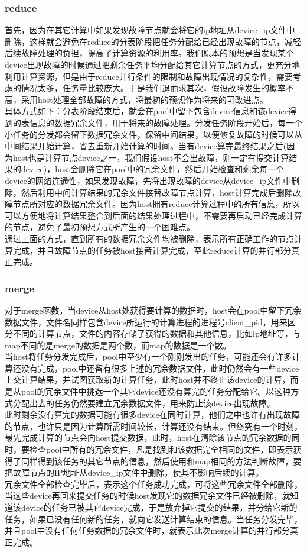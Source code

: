 \documentclass[paper=a4]{ctexart} %
\numberwithin{equation}{section} %
\numberwithin{figure}{section} %
\numberwithin{table}{section} %
\newcommand{\n}{\\\indent}
\begin{document}
\subsubsection{reduce}

    首先，因为在其它计算中如果发现故障节点就会将它的ip地址从device\_ip文件中删除，这样就会避免在reduce的分表阶段把任务分配给已经出现故障的节点，减轻后续故障处理的负担，提高了计算资源的利用率。我们原本的预想是当发现某个device出现故障的时候通过把剩余任务平均分配给其它计算节点的方式，更充分地利用计算资源，但是由于reduce并行条件的限制和故障出现情况的复杂性，需要考虑的情况太多，任务量比较庞大。于是我们退而求其次，假设故障发生的概率不高，采用host处理全部故障的方式，将最初的预想作为将来的可改进点。\n
    具体方式如下：分表阶段结束后，就会在pool中留下包含device信息和该device得到的表信息的数据冗余文件，用于将来的故障处理。分发任务阶段开始后，每一个小任务的分发都会留下数据冗余文件，保留中间结果，以便修复故障的时候可以从中间结果开始计算，省去重新开始计算的时间。当有device算完最终结果之后(因为host也是计算节点device之一，我们假设host不会出故障，则一定有提交计算结果的device)，host会删除它在pool中的冗余文件，然后开始检查和剩余每一个device的网络连通性，如果发现故障，先将出现故障的device从device\_ip文件中删除，然后利用中间计算结果的冗余文件接替故障节点计算，host计算完成后删除故障节点所对应的数据冗余文件。因为host拥有reduce计算过程中的所有信息，所以可以方便地将计算结果整合到后面的结果处理过程中，不需要再启动已经完成计算的节点，避免了最初预想方式所产生的一个困难点。\n
    通过上面的方式，直到所有的数据冗余文件均被删除，表示所有正确工作的节点计算完成，并且故障节点的任务被host接替计算完成，至此reduce计算的并行部分真正完成。

\subsubsection{merge}
    对于merge函数，当device从host处获得要计算的数据时，host会在pool中留下冗余数据文件，文件名同样包含device所运行的计算进程的进程号client\_pid，用来区分不同的计算节点，文件的内容存储了获得的数据和其他信息，比如ip地址等，与map不同的是merge的数据是两个数，而map的数据是一个数。\n
    当host将任务分发完成后，pool中至少有一个刚刚发出的任务，可能还会有许多计算还没有完成，pool中还留有很多上述的冗余数据文件，此时仍然会有一些device上交计算结果，并试图获取新的计算任务，此时host并不终止该device的计算，而是从pool的冗余文件中挑选一个其它device还没有算完的任务分配给它。以这种方式分配出去的任务仍然要建立冗余数据文件，用来防止该device出现故障。\n
    此时剩余没有算完的数据可能有很多device在同时计算，他们之中也许有出现故障的节点，也许只是因为计算所需时间较长，计算还没有结束。但终究有一个时刻，最先完成计算的节点会向host提交数据，此时，host在清除该节点的冗余数据的同时，要检查pool中所有的冗余文件，凡是找到和该数据完全相同的文件，即表示获得了同样得到该任务的其它节点的信息，然后使用和map相同的方法判断故障，要把故障节点的IP地址从device\_ip文件中删除，使其不影响后续的计算。\n
    冗余文件全部检查完毕后，表示这个任务成功完成，可将这些冗余文件全部删除，当这些device再回来提交任务的时候host发现它的数据冗余文件已经被删除，就知道该device的任务已被其它device完成，于是放弃掉它提交的结果，并分给它新的任务，如果已没有任何新的任务，就向它发送计算结束的信息。当任务分发完毕，并且pool中没有任何任务数据的冗余文件时，就表示此次merge计算的并行部分真正完成。
\end{document}
